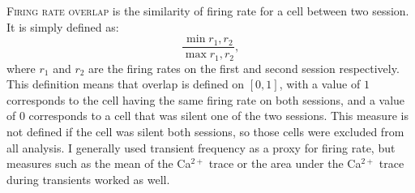 \textsc{Firing rate overlap} is the similarity of firing rate for a cell between two session. It is simply defined as:
$$\frac{\min{r_1, r_2}}{\max{r_1, r_2}},$$
where $r_1$ and $r_2$ are the firing rates on the first and second session respectively.
This definition means that overlap is defined on $[0, 1]$, with a value of $1$ corresponds to the cell having the same firing rate on both sessions, and a value of $0$ corresponds to a cell that was silent one of the two sessions.
This measure is not defined if the cell was silent both sessions, so those cells were excluded from all analysis.
I generally used transient frequency as a proxy for firing rate, but measures such as the mean of the Ca$^{2+}$ trace or the area under the Ca$^{2+}$ trace during transients worked as well.
